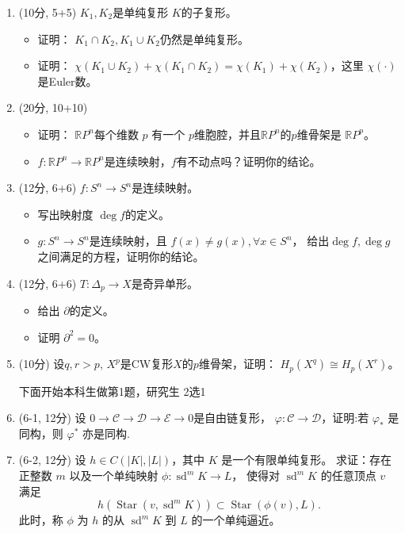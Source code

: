 \begin{enumerate}
    \item (10分, 5+5) $K_1, K_2$是单纯复形 $K$的子复形。
    \begin{itemize}
        \item [(1)] 证明： $K_1\cap K_2, K_1\cup K_2$仍然是单纯复形。
        \item [(2)] 证明： $\chi(K_1\cup K_2)+\chi(K_1\cap K_2)=\chi(K_1)+\chi(K_2)$，这里 $\chi(\cdot)$是Euler数。
    \end{itemize}

    \item (20分, 10+10) 
    \begin{itemize}
        \item [(1)] 证明： $\mathbb{R}P^n$每个维数 $p$ 有一个 $p$维胞腔，并且$\mathbb{R}P^n$的$p$维骨架是 $\mathbb{R}P^p$。
        \item [(2)] $f:\mathbb{R}P^n\to\mathbb{R}P^n$是连续映射，$f$有不动点吗？证明你的结论。
    \end{itemize}

    \item (12分, 6+6) $f:S^n\to S^n$是连续映射。
    \begin{itemize}
        \item [(1)] 写出映射度 $\deg f$的定义。
        \item [(2)] $g:S^n\to S^n$是连续映射，且 $f(x)\neq g(x), \forall x\in S^n$，
        给出$\deg f,\deg g$之间满足的方程，证明你的结论。
    \end{itemize}

    \item (12分, 6+6) $T:\Delta_p\to X$是奇异单形。
    \begin{itemize}
        \item [(1)] 给出 $\partial$的定义。
        \item [(2)] 证明 $\partial^2=0$。
    \end{itemize}

    \item (10分) 设$q,r>p$, $X^p$是CW复形$X$的$p$维骨架，证明： $H_p(X^q)\cong H_p(X^r)$。

    下面开始本科生做第1题，研究生 2选1
    \item (6-1, 12分) 设 $0\to\mathcal{C}\to{\mathcal D}\to\mathcal{E}\to0$是自由链复形，
    $\varphi:\mathcal{C}\to\mathcal{D}$，证明:若 $\varphi_*$ 是同构，则 $\varphi^*$ 亦是同构.
    \item (6-2, 12分) 设 $h \in C(|K|,|L|)$，其中 $K$ 是一个有限单纯复形。
求证：存在正整数 $m$ 以及一个单纯映射 $\phi: \operatorname{sd}^{m}\!K \longrightarrow L$，
使得对 $\operatorname{sd}^{m}\!K$ 的任意顶点 $v$ 满足
$$
h(\operatorname{Star}(v, \operatorname{sd}^{m}\!K)) \subset \operatorname{Star}(\phi(v), L) .
$$
此时，称 $\phi$ 为 $h$ 的从 $\operatorname{sd}^{m}\!K$ 到 $L$ 的一个单纯逼近。


\end{enumerate}
